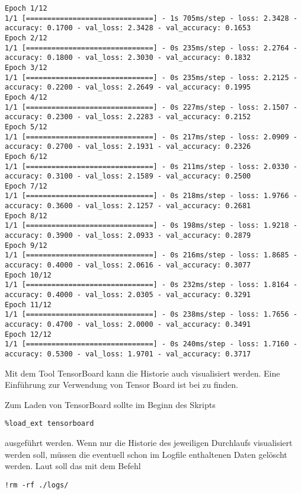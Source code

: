\begin{lstlisting}[numbers=none]
Epoch 1/12
1/1 [==============================] - 1s 705ms/step - loss: 2.3428 - accuracy: 0.1700 - val_loss: 2.3428 - val_accuracy: 0.1653
Epoch 2/12
1/1 [==============================] - 0s 235ms/step - loss: 2.2764 - accuracy: 0.1800 - val_loss: 2.3030 - val_accuracy: 0.1832
Epoch 3/12
1/1 [==============================] - 0s 235ms/step - loss: 2.2125 - accuracy: 0.2200 - val_loss: 2.2649 - val_accuracy: 0.1995
Epoch 4/12
1/1 [==============================] - 0s 227ms/step - loss: 2.1507 - accuracy: 0.2300 - val_loss: 2.2283 - val_accuracy: 0.2152
Epoch 5/12
1/1 [==============================] - 0s 217ms/step - loss: 2.0909 - accuracy: 0.2700 - val_loss: 2.1931 - val_accuracy: 0.2326
Epoch 6/12
1/1 [==============================] - 0s 211ms/step - loss: 2.0330 - accuracy: 0.3100 - val_loss: 2.1589 - val_accuracy: 0.2500
Epoch 7/12
1/1 [==============================] - 0s 218ms/step - loss: 1.9766 - accuracy: 0.3600 - val_loss: 2.1257 - val_accuracy: 0.2681
Epoch 8/12
1/1 [==============================] - 0s 198ms/step - loss: 1.9218 - accuracy: 0.3900 - val_loss: 2.0933 - val_accuracy: 0.2879
Epoch 9/12
1/1 [==============================] - 0s 216ms/step - loss: 1.8685 - accuracy: 0.4000 - val_loss: 2.0616 - val_accuracy: 0.3077
Epoch 10/12
1/1 [==============================] - 0s 232ms/step - loss: 1.8164 - accuracy: 0.4000 - val_loss: 2.0305 - val_accuracy: 0.3291
Epoch 11/12
1/1 [==============================] - 0s 238ms/step - loss: 1.7656 - accuracy: 0.4700 - val_loss: 2.0000 - val_accuracy: 0.3491
Epoch 12/12
1/1 [==============================] - 0s 240ms/step - loss: 1.7160 - accuracy: 0.5300 - val_loss: 1.9701 - val_accuracy: 0.3717
\end{lstlisting}

Mit dem Tool TensorBoard kann die Historie auch visualisiert werden. Eine Einführung zur Verwendung von Tensor Board ist bei \cite{TensorFlow.30.10.2020} zu finden.

Zum Laden von TensorBoard sollte im Beginn des Skripts

\begin{verbatim}
%load_ext tensorboard
\end{verbatim}

ausgeführt werden. Wenn nur die Historie des jeweiligen Durchlaufs visualisiert werden soll, müssen die eventuell schon im Logfile
enthaltenen Daten gelöscht werden. Laut \cite{TensorFlow.30.10.2020} soll das mit dem Befehl

\begin{verbatim}
!rm -rf ./logs/
\end{verbatim}

